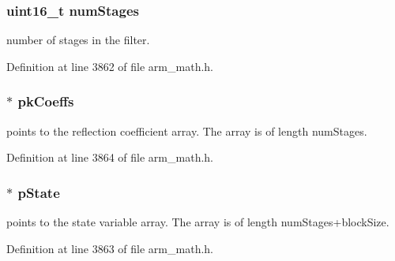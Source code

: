 \subsubsection[{\texorpdfstring{num\+Stages}{numStages}}]{\setlength{\rightskip}{0pt plus 5cm}uint16\+\_\+t num\+Stages}\hypertarget{structarm__iir__lattice__instance__f32_a4cceb90547b3e585d4c7aabaa8057212}{}\label{structarm__iir__lattice__instance__f32_a4cceb90547b3e585d4c7aabaa8057212}
number of stages in the filter. 

Definition at line 3862 of file arm\+\_\+math.\+h.

\subsubsection[{\texorpdfstring{pk\+Coeffs}{pkCoeffs}}]{$\ast$ pk\+Coeffs}\hypertarget{structarm__iir__lattice__instance__f32_a994889c5c4a866c50a0ee63326378816}{}\label{structarm__iir__lattice__instance__f32_a994889c5c4a866c50a0ee63326378816}
points to the reflection coefficient array. The array is of length num\+Stages. 

Definition at line 3864 of file arm\+\_\+math.\+h.

\subsubsection[{\texorpdfstring{p\+State}{pState}}]{$\ast$ p\+State}\hypertarget{structarm__iir__lattice__instance__f32_a335c87e6fdc4b96601d95a5de8b9c463}{}\label{structarm__iir__lattice__instance__f32_a335c87e6fdc4b96601d95a5de8b9c463}
points to the state variable array. The array is of length num\+Stages+block\+Size. 

Definition at line 3863 of file arm\+\_\+math.\+h.

